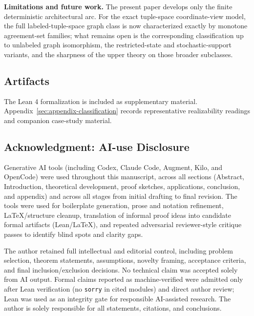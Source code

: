 \textbf{Limitations and future work.} The present paper develops only the finite deterministic architectural arc. For the exact tuple-space coordinate-view model, the full labeled-tuple-space graph class is now characterized exactly by monotone agreement-set families; what remains open is the corresponding classification up to unlabeled graph isomorphism, the restricted-state and stochastic-support variants, and the sharpness of the upper theory on those broader subclasses.

\subsection{Artifacts}\label{sec:data-availability}

The Lean 4 formalization is included as supplementary material. Appendix~\ref{sec:appendix-classification} records representative realizability readings and companion case-study material.

\subsection*{Acknowledgment: AI-use Disclosure}

Generative AI tools (including Codex, Claude Code, Augment, Kilo, and OpenCode) were used throughout this manuscript, across all sections (Abstract, Introduction, theoretical development, proof sketches, applications, conclusion, and appendix) and across all stages from initial drafting to final revision. The tools were used for boilerplate generation, prose and notation refinement, \LaTeX{}/structure cleanup, translation of informal proof ideas into candidate formal artifacts (Lean/\LaTeX{}), and repeated adversarial reviewer-style critique passes to identify blind spots and clarity gaps.

The author retained full intellectual and editorial control, including problem selection, theorem statements, assumptions, novelty framing, acceptance criteria, and final inclusion/exclusion decisions. No technical claim was accepted solely from AI output. Formal claims reported as machine-verified were admitted only after Lean verification (no \texttt{sorry} in cited modules) and direct author review; Lean was used as an integrity gate for responsible AI-assisted research. The author is solely responsible for all statements, citations, and conclusions.
